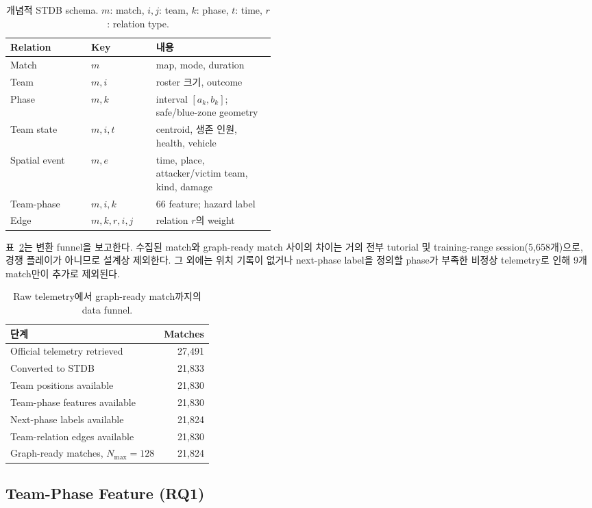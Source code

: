 \begin{table}[t]
\centering
\caption{개념적 STDB schema. \(m\): match, \(i,j\): team, \(k\): phase,
\(t\): time, \(r\): relation type.}
\label{tab:stdb-schema}
\small
\begin{tabular}{llp{0.45\linewidth}}
\toprule
Relation & Key & 내용 \\
\midrule
Match & \(m\) & map, mode, duration \\
Team & \(m,i\) & roster 크기, outcome \\
Phase & \(m,k\) & interval \([a_k,b_k]\); safe/blue-zone geometry \\
Team state & \(m,i,t\) & centroid, 생존 인원, health, vehicle \\
Spatial event & \(m,e\) & time, place, attacker/victim team, kind, damage \\
Team-phase & \(m,i,k\) & 66 feature; hazard label \\
Edge & \(m,k,r,i,j\) & relation \(r\)의 weight \\
\bottomrule
\end{tabular}
\end{table}

표~\ref{tab:data-funnel}는 변환 funnel을 보고한다. 수집된 match와
graph-ready match 사이의 차이는 거의 전부 tutorial 및 training-range
session(5,658개)으로, 경쟁 플레이가 아니므로 설계상 제외한다. 그 외에는
위치 기록이 없거나 next-phase label을 정의할 phase가 부족한 비정상
telemetry로 인해 9개 match만이 추가로 제외된다.

\begin{table}[t]
\centering
\caption{Raw telemetry에서 graph-ready match까지의 data funnel.}
\label{tab:data-funnel}
\small
\begin{tabular}{lr}
\toprule
단계 & Matches \\
\midrule
Official telemetry retrieved & 27,491 \\
Converted to STDB & 21,833 \\
Team positions available & 21,830 \\
Team-phase features available & 21,830 \\
Next-phase labels available & 21,824 \\
Team-relation edges available & 21,830 \\
Graph-ready matches, \(N_{\max}=128\) & 21,824 \\
\bottomrule
\end{tabular}
\end{table}

\subsection{Team-Phase Feature (RQ1)}
\label{sec:methods-features}

